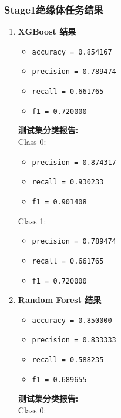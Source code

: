 \documentclass[lang=cn,scheme=chinese,color=blue,device=normal,toc=onecol,math=cm]{elegantbook}
\begin{document}
\subsubsection{Stage1绝缘体任务结果}


\begin{enumerate}
\item \textbf{XGBoost 结果}\par
 
\begin{itemize}
\item \texttt{accuracy = 0.854167}
\item \texttt{precision = 0.789474}
\item \texttt{recall = 0.661765}
\item \texttt{f1 = 0.720000}
\end{itemize}
 
\textbf{测试集分类报告:}\\ Class 0:\par
 
\begin{itemize}
\item \texttt{precision = 0.874317}
\item \texttt{recall = 0.930233}
\item \texttt{f1 = 0.901408}
\end{itemize}
 
Class 1:\par
 
\begin{itemize}
\item \texttt{precision = 0.789474}
\item \texttt{recall = 0.661765}
\item \texttt{f1 = 0.720000}
\end{itemize}
\item \textbf{Random Forest 结果}\par
 
\begin{itemize}
\item \texttt{accuracy = 0.850000}
\item \texttt{precision = 0.833333}
\item \texttt{recall = 0.588235}
\item \texttt{f1 = 0.689655}
\end{itemize}
 
\textbf{测试集分类报告:}\\ Class 0:\par
 

\end{enumerate}
\end{document}
